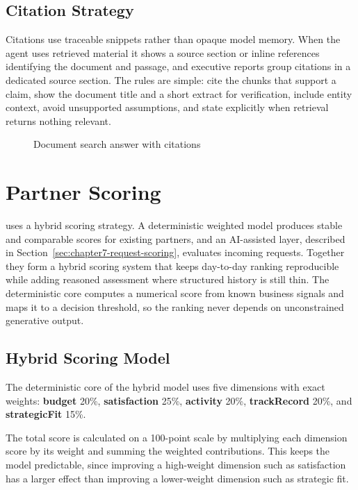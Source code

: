 \subsection{Citation Strategy}
\label{subsec:chapter7-citation-strategy}

Citations use traceable snippets rather than opaque model memory. When the agent uses retrieved material it shows a source section or inline references identifying the document and passage, and executive reports group citations in a dedicated source section. The rules are simple: cite the chunks that support a claim, show the document title and a short extract for verification, include entity context, avoid unsupported assumptions, and state explicitly when retrieval returns nothing relevant.

\begin{figure}[htbp]
  \caption{Document search answer with citations}
  \label{fig:chapter7-rag-citation-screenshot}
\end{figure}

\section{Partner Scoring}
\label{sec:chapter7-partner-scoring}

\projectname{} uses a hybrid scoring strategy. A deterministic weighted model produces stable and comparable scores for existing partners, and an AI-assisted layer, described in Section~\ref{sec:chapter7-request-scoring}, evaluates incoming requests. Together they form a hybrid scoring system that keeps day-to-day ranking reproducible while adding reasoned assessment where structured history is still thin. The deterministic core computes a numerical score from known business signals and maps it to a decision threshold, so the ranking never depends on unconstrained generative output.

\subsection{Hybrid Scoring Model}
\label{subsec:chapter7-deterministic-scoring-model}

The deterministic core of the hybrid model uses five dimensions with exact weights: \textbf{budget} 20\%, \textbf{satisfaction} 25\%, \textbf{activity} 20\%, \textbf{trackRecord} 20\%, and \textbf{strategicFit} 15\%.

The total score is calculated on a 100-point scale by multiplying each dimension score by its weight and summing the weighted contributions. This keeps the model predictable, since improving a high-weight dimension such as satisfaction has a larger effect than improving a lower-weight dimension such as strategic fit.

